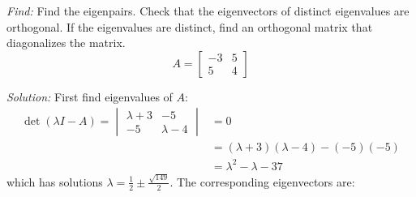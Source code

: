 \documentclass[11pt]{homework}
\begin{document}
\maketitle

\question
\emph{Find:}
\newline
Find the eigenpairs.
Check that the eigenvectors of distinct eigenvalues are orthogonal.
If the eigenvalues are distinct, find an orthogonal matrix that diagonalizes the matrix.
\begin{equation*}
A = 
  \begin{bmatrix}
  -3 & 5 \\
  5 & 4
  \end{bmatrix}
\end{equation*}

\emph{Solution:}
\newline
First find eigenvalues of $A$:
\begin{align*}
\det (\lambda I - A) = 
  \begin{vmatrix}
  \lambda + 3 & -5 \\
  -5          & \lambda - 4
  \end{vmatrix}
  &= 0 \\
  &= (\lambda + 3) ( \lambda -4) - (-5)(-5) \\
  &= \lambda^2 - \lambda - 37 
\end{align*}
which has solutions $\lambda = \frac{1}{2} \pm \frac{\sqrt{149}}{2}$.
The corresponding eigenvectors are:
\end{document}
